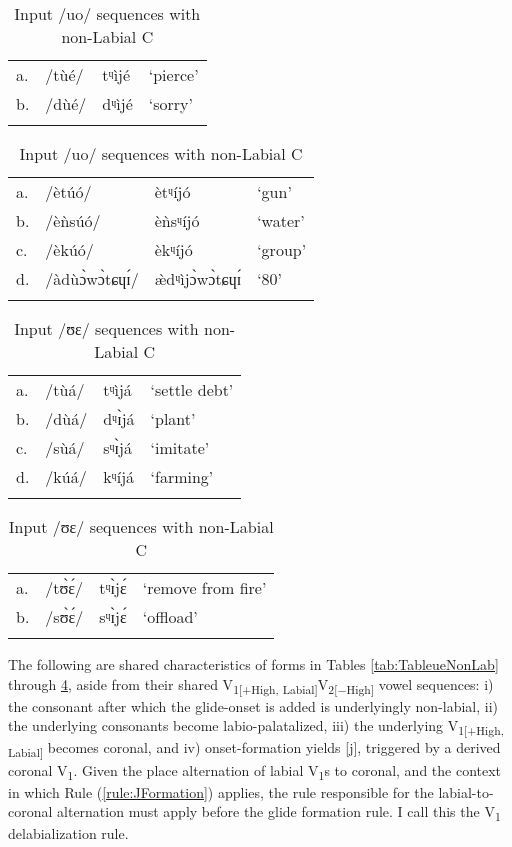 \documentclass[output=paper,colorlinks,citecolor=brown]{langscibook}
\begin{document}
\begin{table}
\begin{floatrow}
\ttabbox
 {\begin{tabular}{llll}
  \lsptoprule
a. & /tùé/ &	tᶣìjé&	‘pierce’\\
b. & /dùé/ &	dᶣìjé	&‘sorry’\\
  \lspbottomrule
 \end{tabular}}
{\caption{Input /ue/ sequences with non-Labial C\label{tab:TableueNonLab}}}

\ttabbox
 {\begin{tabular}{llll}
  \lsptoprule
a.&	/ètúó/ &	ètᶣíjó&	‘gun’\\
b.&	/èǹsúó/ 	&èǹsᶣíjó	&‘water’\\
c.	&/èkúó/	&èkᶣíjó&	‘group’\\
d. 	&/àdùɔ̀wɔ̀tɕɥɪ́/ &	æ̀dᶣìjɔ̀wɔ̀tɕɥɪ́	&‘80’\\
  \lspbottomrule
 \end{tabular}}
{\caption{Input /uo/ sequences with non-Labial C}\label{tab:Tableuo2}}
\end{floatrow}
\end{table}   

\begin{table}
\begin{floatrow}
\ttabbox
 {\begin{tabular}{llll}
  \lsptoprule
a.& 	/tùá/&	tᶣìjá	&‘settle debt’\\
b.&	/dùá/&	dᶣɪ̀já&	‘plant’\\
c.	&/sùá/&	sᶣɪ̀já	&‘imitate’\\
d.&	/kúá/&	kᶣíjá	&‘farming’\\
  \lspbottomrule
 \end{tabular}}
{\caption{Input /ua/ sequences with non-Labial C}\label{tab:Tableua2}}

\ttabbox
 {\begin{tabular}{llll}
  \lsptoprule
a. 	&/tʊ̀ɛ́/	&tᶣɪ̀jɛ́	&‘remove from fire’\\
b. &	/sʊ̀ɛ́/ &	sᶣɪ̀jɛ́	&‘offload’\\
  \lspbottomrule
 \end{tabular}}
{\caption{Input /ʊɛ/ sequences with non-Labial C}\label{tab:TableUE}}
\end{floatrow}
\end{table}   

The following are shared characteristics of forms in Tables \ref{tab:TableueNonLab} through \ref{tab:TableUE}, aside from their shared V\textsubscript{1[+High, Labial]}V\textsubscript{2[−High]} vowel sequences: i) the consonant after which the glide-onset is added is underlyingly non-labial, ii) the underlying consonants become  labio-palatalized, iii) the underlying V\textsubscript{1[+High, Labial]} becomes coronal, and iv) onset-formation yields [j], triggered by a derived coronal V\textsubscript{1}. Given the place alternation of labial V\textsubscript{1}s to coronal, and the context in which Rule (\ref{rule:JFormation}) applies, the rule responsible for the labial-to-coronal alternation must apply before the glide formation rule. I call this the V\textsubscript{1} delabialization rule. 
\end{document}
